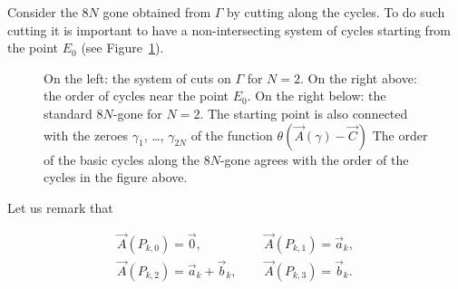\documentclass[12pt]{article}
\begin{document}
Consider the $8N$ gone obtained from $\Gamma$ by cutting along the cycles. To do such cutting it is important to have a non-intersecting system of cycles starting from the point $E_0$ (see Figure~\ref{fig:8N-gone}). 

\begin{figure}[H]
\centering
\parbox{7cm}{\epsfysize=14cm}%
\parbox{8.5cm}{\begin{center}\epsfxsize=3cm 

\vspace{2cm}  

\epsfxsize=8cm \end{center}}
\caption{\label{fig:8N-gone} On the left: the system of cuts on $\Gamma$ for $N=2$. On the right above: the order of cycles near the point $E_0$. On the right below: the standard $8N$-gone for $N=2$. The starting point is also connected with the zeroes $\gamma_1$, \ldots,  $\gamma_{2N}$  of the function $\theta(\vec A(\gamma)-\vec C)$ The order of the basic cycles along the $8N$-gone agrees with the order of the cycles in the figure above.}
\end{figure}

Let us remark that

\begin{equation}
\begin{split}
\vec A(P_{k,0}) = \vec 0, \ \ \ \ \ \ \ & \vec A(P_{k,1}) = \vec a_k, \\
\vec A(P_{k,2}) = \vec a_k+ \vec b_k, \ \ \ \ \ \ & \vec A(P_{k,3}) = \vec b_k. \\
\end{split}
\end{equation}
\end{document}
